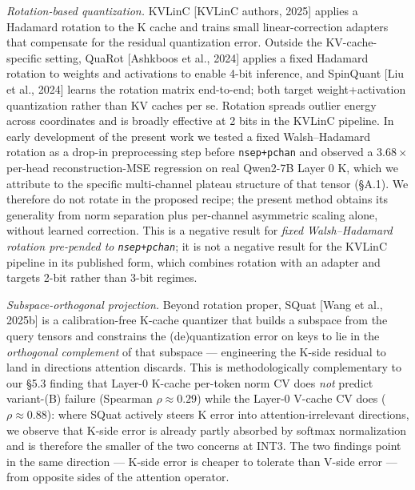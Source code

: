 \documentclass[
]{article}
\begin{document}
\emph{Rotation-based quantization.} KVLinC {[}KVLinC authors, 2025{]}
applies a Hadamard rotation to the K cache and trains small
linear-correction adapters that compensate for the residual quantization
error. Outside the KV-cache-specific setting, QuaRot {[}Ashkboos et al.,
2024{]} applies a fixed Hadamard rotation to weights and activations to
enable 4-bit inference, and SpinQuant {[}Liu et al., 2024{]} learns the
rotation matrix end-to-end; both target weight+activation quantization
rather than KV caches per se. Rotation spreads outlier energy across
coordinates and is broadly effective at 2 bits in the KVLinC pipeline.
In early development of the present work we tested a fixed
Walsh--Hadamard rotation as a drop-in preprocessing step before
\texttt{nsep+pchan} and observed a \(3.68\times\) per-head
reconstruction-MSE regression on real Qwen2-7B Layer 0 K, which we
attribute to the specific multi-channel plateau structure of that tensor
(§A.1). We therefore do not rotate in the proposed recipe; the present
method obtains its generality from norm separation plus per-channel
asymmetric scaling alone, without learned correction. This is a negative
result for \emph{fixed Walsh--Hadamard rotation pre-pended to
\texttt{nsep+pchan}}; it is not a negative result for the KVLinC
pipeline in its published form, which combines rotation with an adapter
and targets 2-bit rather than 3-bit regimes.

\emph{Subspace-orthogonal projection.} Beyond rotation proper, SQuat
{[}Wang et al., 2025b{]} is a calibration-free K-cache quantizer that
builds a subspace from the query tensors and constrains the
(de)quantization error on keys to lie in the \emph{orthogonal
complement} of that subspace --- engineering the K-side residual to land
in directions attention discards. This is methodologically complementary
to our §5.3 finding that Layer-0 K-cache per-token norm CV does
\emph{not} predict variant-(B) failure (Spearman \(\rho \approx 0.29\))
while the Layer-0 V-cache CV does (\(\rho \approx 0.88\)): where SQuat
actively steers K error into attention-irrelevant directions, we observe
that K-side error is already partly absorbed by softmax normalization
and is therefore the smaller of the two concerns at INT3. The two
findings point in the same direction --- K-side error is cheaper to
tolerate than V-side error --- from opposite sides of the attention
operator.
\end{document}
